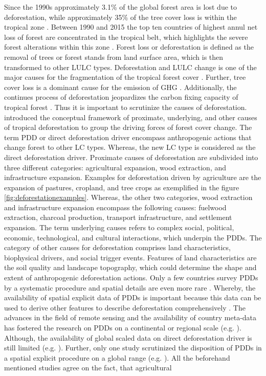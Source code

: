 	Since the 1990s approximately 3.1\% of the global forest area is lost due to deforestation, while approximately 35\% of the tree cover loss is within the tropical zone \citep{FAO2016}. Between 1990 and 2015 the top ten countries of highest annul net loss of forest are concentrated in the tropical belt, which highlights the severe forest alterations within this zone \citep{FAO2010,FAO2016}. Forest loss or deforestation is defined as the removal of trees or forest stands from land surface area, which is then transformed to other \ac{LULC} types. Deforestation and \ac{LULC} change is one of the major causes for the fragmentation of the tropical forest cover \citep{Taubert2018}. Further, tree cover loss is a dominant cause for the emission of \ac{GHG} \citep{Don2010,Baccini2012}. Additionally, the continues process of deforestation jeopardizes the carbon fixing capacity of tropical forest \citep{Baccini2017}. Thus it is important to scrutinize the causes of deforestation. \citet{Geist2001} introduced the conceptual framework of proximate, underlying, and other causes of tropical deforestation to group the driving forces of forest cover change. The term \ac{PDD} or direct deforestation driver encompass anthropogenic actions that change forest to other \ac{LC} types. Whereas, the new \ac{LC} type is considered as the direct deforestation driver. Proximate causes of deforestation are subdivided into three different categories: agricultural expansion, wood extraction, and infrastructure expansion. Examples for deforestation driven by agriculture are the expansion of pastures, cropland, and tree crops as exemplified in the figure \ref{fig:deforestationexamples}. Whereas, the other two categories, wood extraction and infrastructure expansion encompass the following causes: fuelwood extraction, charcoal production, transport infrastructure, and settlement expansion. The term underlying causes refers to complex social, political, economic, technological, and cultural interactions, which underpin the \acp{PDD}. The category of other causes for deforestation comprises land characteristics, biophysical drivers, and social trigger events. Features of land characteristics are the soil quality and landscape topography, which could determine the shape and extent of anthropogenic deforestation actions. Only a few countries survey \acp{PDD} by a systematic procedure and spatial details are even more rare \citep{Sy2015,Hosonuma2012}. Whereby, the availability of spatial explicit data of \acp{PDD} is important because this data can be used to derive other features to describe deforestation comprehensively \citep{Hosonuma2012}. The advances in the field of remote sensing and the availability of country meta-data has fostered the research on \acp{PDD} on a continental or regional scale (e.g. \citet{Sy2015,Austin2019,Zalles2018,Meyfroidt2013,Caldas2013,Graesser2015,Ruf2014,Connette2016,Barima2016,Furumo2017,Vijay2018}). Although, the availability of global scaled data on direct deforestation driver is still limited (e.g. \citet{Curtis2018,Hosonuma2012,Geist2002,DeFries2010,Carter2018}). Further, only one study scrutinized the disposition of \acp{PDD} in a spatial explicit procedure on a global range (e.g. \citet{Curtis2018}). All the beforehand mentioned studies agree on the fact, that agricultural 
